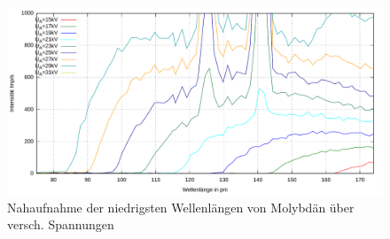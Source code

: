\documentclass[numbers=noenddot,12pt,a4paper]{scrartcl}
\begin{document}
\begin{figure}[H]
	\centering
	\includegraphics[width=\textwidth]{molymin.pdf}
	\caption{Nahaufnahme der niedrigsten Wellenlängen von Molybdän über versch. Spannungen} \label{img:momin}
\end{figure}
\end{document}
